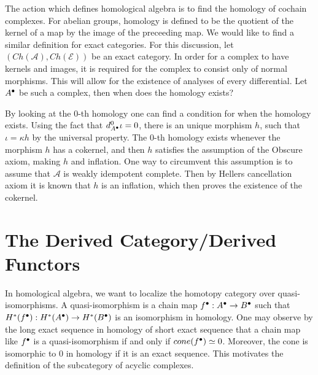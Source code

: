 
     The action which defines homological algebra is to find the homology of cochain complexes. For abelian groups, homology is defined to be the quotient of the kernel of a map by the image of the preceeding map. We would like to find a similar definition for exact categories. For this discussion, let $(Ch(\mathcal{A}),Ch(\mathcal{E}))$ be an exact category. In order for a complex to have kernels and images, it is required for the complex to consist only of normal morphisms. This will allow for the existence of analyses of every differential. Let $A^{\bullet}$ be such a complex, then when does the homology exists?

    \begin{center}
    \end{center}

    By looking at the 0-th homology one can find a condition for when the homology exists. Using the fact that $d^0_{A^{\bullet}}\iota = 0$, there is an unique morphism $h$, such that $\iota = \kappa h$ by the universal property. The 0-th homology exists whenever the morphism $h$ has a cokernel, and then $h$ satisfies the assumption of the Obscure axiom, making $h$ and inflation. One way to circumvent this assumption is to assume that $\mathcal{A}$ is weakly idempotent complete. Then by Hellers cancellation axiom it is known that $h$ is an inflation, which then proves the existence of the cokernel. 

    
\section{The Derived Category/Derived Functors}  
    
     In homological algebra, we want to localize the homotopy category over quasi-isomorphisms. A quasi-isomorphism is a chain map $f^{\bullet}:A^{\bullet}\rightarrow B^{\bullet}$ such that $H^*(f^{\bullet}):H^*(A^{\bullet})\rightarrow H^*(B^{\bullet})$ is an isomorphism in homology. One may observe by the long exact sequence in homology of short exact sequence that a chain map like $f^{\bullet}$ is a quasi-isomorphism if and only if $cone(f^{\bullet})\simeq 0$. Moreover, the cone is isomorphic to $0$ in homology if it is an exact sequence. This motivates the definition of the subcategory of acyclic complexes.

